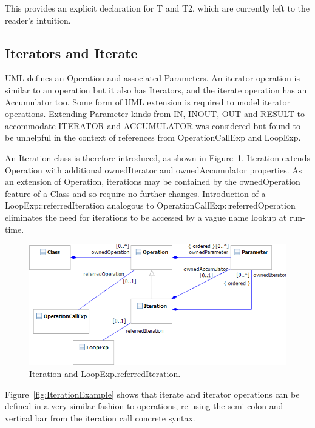 \documentclass{eceasst}
\begin{document}
This provides an explicit declaration for T and T2, which are currently left to the reader's intuition.

\subsection{Iterators and Iterate}

UML defines an Operation and associated Parameters. An iterator operation is similar to an operation but it also has Iterators, and the iterate operation has an Accumulator too. Some form of UML extension is required to model iterator operations. Extending Parameter kinds from  IN, INOUT, OUT and RESULT to accommodate ITERATOR and ACCUMULATOR was considered but found to be unhelpful in the context of references from OperationCallExp and LoopExp.

An Iteration class is therefore introduced, as shown in Figure~\ref{fig:Iteration}. Iteration extends Operation with additional ownedIterator and ownedAccumulator properties. As an extension of Operation, iterations may be contained by the ownedOperation feature of a Class and so require no further changes. Introduction of a LoopExp::referredIteration analogous to OperationCallExp::referredOperation eliminates the need for iterations to be accessed by a vague name lookup at run-time.

\begin{figure}
  \begin{center}
    \includegraphics[width=5.75in]{Iteration.png}
  \end{center}
  \caption{Iteration and LoopExp.referredIteration.}
  \label{fig:Iteration}
\end{figure}

Figure~\ref{fig:IterationExample} shows that iterate and iterator operations can be defined in a very similar fashion to operations, re-using the semi-colon and vertical bar from the iteration call concrete syntax. 
\end{document}
